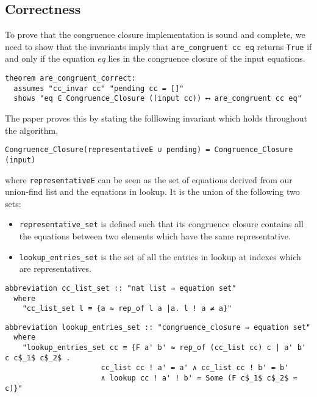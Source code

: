 \subsection{Correctness}
\label{subsection:uf-correctness}

To prove that the congruence closure implementation is sound and complete, we need to show that the invariants imply that \lstinline{are_congruent cc eq} returns \lstinline{True} if and only if the equation $eq$ lies in the congruence closure of the input equations.

\begin{lstlisting}
theorem are_congruent_correct:
  assumes "cc_invar cc" "pending cc = []"
  shows "eq ∈ Congruence_Closure ((input cc)) ⟷ are_congruent cc eq"
\end{lstlisting}

The paper \cite{Nieuwenhuis} proves this by stating the folllowing invariant which holds throughout the algorithm,

\begin{lstlisting}
Congruence_Closure(representativeE ∪ pending) = Congruence_Closure (input)
\end{lstlisting}

where \lstinline{representativeE} can be seen as the set of equations derived from our union-find list and the equations in lookup. It is the union of the following two sets:

\begin{itemize}
    \item\lstinline{representative_set} is defined such that its congruence closure contains all the equations between two elements which have the same representative.
    \item\lstinline{lookup_entries_set} is the set of all the entries in lookup at indexes which are representatives.
\end{itemize}

\begin{lstlisting}
abbreviation cc_list_set :: "nat list ⇒ equation set"
  where
    "cc_list_set l ≡ {a ≈ rep_of l a |a. l ! a ≠ a}"
\end{lstlisting}

\begin{lstlisting}
abbreviation lookup_entries_set :: "congruence_closure ⇒ equation set"
  where
    "lookup_entries_set cc ≡ {F a' b' ≈ rep_of (cc_list cc) c | a' b' c c$_1$ c$_2$ .
                      cc_list cc ! a' = a' ∧ cc_list cc ! b' = b'
                      ∧ lookup cc ! a' ! b' = Some (F c$_1$ c$_2$ ≈ c)}"
\end{lstlisting}

